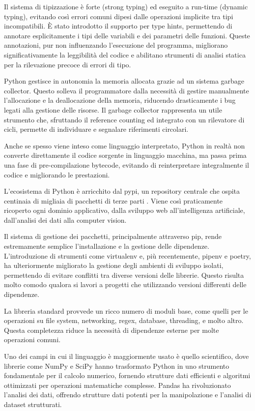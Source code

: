 Il sistema di tipizzazione è forte (strong typing) ed eseguito a run-time (dynamic typing), evitando così errori comuni
dipesi dalle operazioni implicite tra tipi incompatibili. È stato introdotto il supporto per type hints, permettendo
di annotare esplicitamente i tipi delle variabili e dei parametri delle funzioni. Queste annotazioni, pur non
influenzando l'esecuzione del programma, migliorano significativamente la leggibilità del codice e abilitano strumenti
di analisi statica per la rilevazione precoce di errori di tipo.

Python gestisce in autonomia la memoria allocata grazie ad un sistema garbage collector.
Questo solleva il programmatore dalla necessità di gestire manualmente l'allocazione e la deallocazione della memoria,
riducendo drasticamente i bug legati alla gestione delle risorse. Il garbage collector rappresenta un utile strumento
che, sfruttando il reference counting ed integrato con un rilevatore di cicli, permette di individuare e segnalare
riferimenti circolari.

Anche se spesso viene inteso come linguaggio interpretato, Python in realtà non converte direttamente
il codice sorgente in linguaggio macchina, ma passa prima una fase di pre-compilazione bytecode, evitando di
reinterpretare integralmente il codice e migliorando le prestazioni.

L'ecosistema di Python è arricchito dal \acrfull{pypi}, un repository centrale che ospita centinaia di migliaia di
pacchetti di terze parti \citep{pypi_2023}. Viene così  praticamente ricoperto ogni dominio applicativo,
dalla sviluppo web all'intelligenza artificiale, dall'analisi dei dati alla computer vision.

Il sistema di gestione dei pacchetti, principalmente attraverso pip, rende estremamente semplice l'installazione e la
gestione delle dipendenze. L'introduzione di strumenti come virtualenv e, più recentemente, pipenv e poetry,
ha ulteriormente migliorato la gestione degli ambienti di sviluppo isolati, permettendo di evitare conflitti
tra diverse versioni delle librerie. Questo risulta molto comodo qualora si lavori a progetti che utilizzando versioni
differenti delle dipendenze.

La libreria standard provvede un ricco numero di moduli base, come quelli per le operazioni su file system, networking,
regex, database, threading, e molto altro. Questa completezza riduce la necessità di dipendenze esterne per molte
operazioni comuni.

Uno dei campi in cui il linguaggio è maggiormente usato è quello scientifico, dove librerie come NumPy e SciPy
hanno trasformato Python in uno strumento fondamentale per il calcolo numerico,
fornendo strutture dati efficienti e algoritmi ottimizzati per operazioni matematiche complesse.
Pandas ha rivoluzionato l'analisi dei dati, offrendo strutture dati potenti per la manipolazione e l'analisi
di dataset strutturati.

